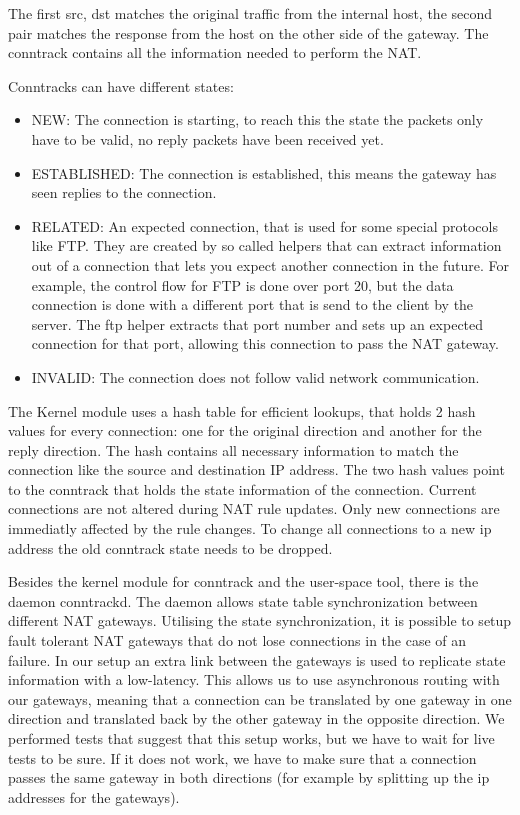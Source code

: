 \documentclass{report}
\begin{document}
The first src, dst matches the original traffic from the internal host,
the second pair matches the response from the host on the other side of
the gateway. The conntrack contains all the information needed to
perform the NAT.

Conntracks can have different states:

\begin{itemize}
\item
  NEW: The connection is starting, to reach this the state the packets
  only have to be valid, no reply packets have been received yet.
\item
  ESTABLISHED: The connection is established, this means the gateway has
  seen replies to the connection.
\item
  RELATED: An expected connection, that is used for some special
  protocols like FTP. They are created by so called helpers that can
  extract information out of a connection that lets you expect another
  connection in the future. For example, the control flow for FTP is done
  over port 20, but the data connection is done with a different port
  that is send to the client by the server. The ftp helper extracts that
  port number and sets up an expected connection for that port, allowing
  this connection to pass the NAT gateway.
\item
  INVALID: The connection does not follow valid network communication.
\end{itemize}

The Kernel module uses a hash table for efficient lookups, that holds 2
hash values for every connection: one for the original direction and another
for the reply direction. The hash contains all necessary information to
match the connection like the source and destination IP address. The two
hash values point to the conntrack that holds the state information of
the connection. Current connections are not altered during NAT rule updates.
Only new connections are immediatly affected by the rule changes. To change all
connections to a new ip address the old conntrack state needs to be dropped.

Besides the kernel module for conntrack and the user-space tool, there is the
daemon conntrackd. The daemon allows state table synchronization
between different NAT gateways. Utilising the state synchronization, it is
possible to setup fault tolerant NAT gateways that do not lose
connections in the case of an failure. In our setup an extra link
between the gateways is used to replicate state information with a low-latency.
This allows us to use asynchronous routing with our gateways, meaning that a
connection can be translated by one gateway in one
direction and translated back by the other gateway in the opposite
direction. We performed tests that suggest that this setup works, but we have
to wait for live tests to be sure. If it does not work,
we have to make sure that a connection passes the same gateway in both
directions (for example by splitting up the ip addresses for the
gateways).
\end{document}
